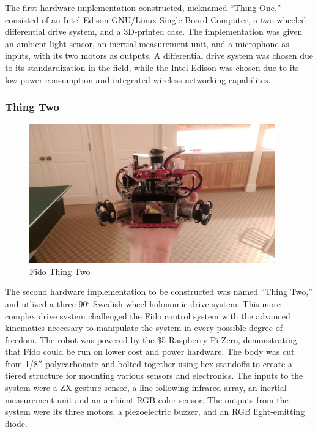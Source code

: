 The first hardware implementation constructed, nicknamed ``Thing One,'' consisted of an Intel Edison GNU/Linux Single Board Computer, a two-wheeled differential drive system, and a 3D-printed case.
The implementation was given an ambient light sensor, an inertial measurement unit, and a microphone as inputs, with its two motors as outputs.
A differential drive system was chosen due to its standardization in the field, while the Intel Edison was chosen due to its low power consumption and integrated wireless networking capabilites.

\subsubsection{Thing Two}
\begin{figure}
	\centering
	\includegraphics[height=6cm]{Figures/ThingTwo.jpg}
	\caption{Fido Thing Two}
\end{figure}

The second hardware implementation to be constructed was named ``Thing Two,'' and utlized a three 90$^{\circ}$ Swedish wheel holonomic drive system.
This more complex drive system challenged the Fido control system with the advanced kinematics neccesary to manipulate the system in every possible degree of freedom.
The robot was powered by the \$5 Raspberry Pi Zero, demonstrating that Fido could be run on lower cost and power hardware.
The body was cut from 1/8$''$ polycarbonate and bolted together using hex standoffs to create a tiered structure for mounting various sensors and electronics.
The inputs to the system were a ZX gesture sensor, a line following infrared array, an inertial measurement unit and an ambient RGB color sensor.
The outputs from the system were its three motors, a piezoelectric buzzer, and an RGB light-emitting diode.

